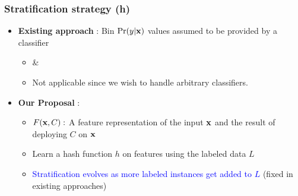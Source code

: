 \documentclass[usenames,dvipsnames, 11pt]{beamer}
\newcommand{\vek}[1]{{\bf {#1}}}
\newcommand{\vx}{{\vek{x}}}
\newlength{\wideitemsep}
\let\olditem\item
\renewcommand{\item}{\setlength{\itemsep}{\wideitemsep}\olditem}
\begin{document}
\begin{frame}
\frametitle{Stratification strategy (h)}
\begin{itemize}
\pause
\item \textbf{Existing approach} : Bin $\Pr(y|\vx)$ values assumed to be provided by a classifier 
  \begin{itemize}
  \item \citeauthor{bennett10} \& \citeauthor{druck11} %
  \item Not applicable since we wish to handle arbitrary classifiers.
  \end{itemize}
  \pause  
\item \textbf{Our Proposal} : 
  \begin{itemize}
  \pause
  \item $F(\vx,C):$ A feature representation of the input $\vx$ and the result of deploying $C$ on  $\vx$
  \item Learn a hash function $h$ on features using the labeled data $L$
  \item \textcolor{blue}{Stratification evolves as more labeled instances get added to $L$} (fixed in existing approaches)
  \end{itemize}
\end{itemize}
\end{frame}
\end{document}

